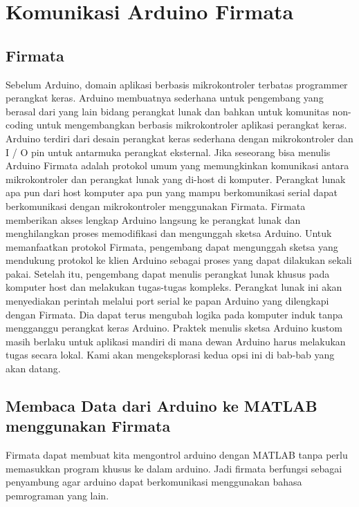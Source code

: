 \section{Komunikasi Arduino Firmata}
\subsection{Firmata}
	Sebelum Arduino, domain aplikasi berbasis mikrokontroler terbatas programmer perangkat keras. Arduino membuatnya sederhana untuk pengembang yang berasal dari yang lain bidang perangkat lunak dan bahkan untuk komunitas non-coding untuk mengembangkan berbasis mikrokontroler aplikasi perangkat keras. Arduino terdiri dari desain perangkat keras sederhana dengan mikrokontroler dan I / O pin untuk antarmuka perangkat eksternal. Jika seseorang bisa menulis Arduino 
	Firmata adalah protokol umum yang memungkinkan komunikasi antara mikrokontroler dan perangkat lunak yang di-host di komputer. 
	Perangkat lunak apa pun dari host komputer apa pun yang mampu berkomunikasi serial dapat berkomunikasi dengan mikrokontroler menggunakan Firmata. 
	Firmata memberikan akses lengkap Arduino langsung ke perangkat lunak dan menghilangkan proses memodifikasi dan mengunggah sketsa Arduino. 
	Untuk memanfaatkan protokol Firmata, pengembang dapat mengunggah sketsa yang mendukung protokol ke klien Arduino sebagai proses yang dapat dilakukan sekali pakai. 
	Setelah itu, pengembang dapat menulis perangkat lunak khusus pada komputer host dan melakukan tugas-tugas kompleks. Perangkat lunak ini akan menyediakan perintah melalui port serial ke papan Arduino yang dilengkapi dengan Firmata. Dia dapat terus mengubah logika pada komputer induk tanpa mengganggu perangkat keras Arduino. 
	Praktek menulis sketsa Arduino kustom masih berlaku untuk aplikasi mandiri di mana dewan Arduino harus melakukan tugas secara lokal. Kami akan mengeksplorasi kedua opsi ini di bab-bab yang akan datang.

\subsection{Membaca Data dari Arduino ke MATLAB menggunakan Firmata}
	Firmata dapat membuat kita mengontrol arduino dengan MATLAB tanpa perlu memasukkan program khusus ke dalam arduino. Jadi firmata berfungsi sebagai penyambung agar arduino dapat berkomunikasi menggunakan bahasa pemrograman yang lain.
	
